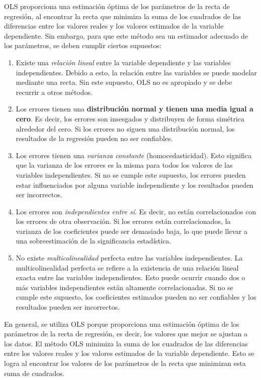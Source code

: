 \documentclass[
]{book}
\begin{document}
OLS proporciona una estimación óptima de los parámetros de la recta de
regresión, al encontrar la recta que minimiza la suma de los cuadrados
de las diferencias entre los valores reales y los valores estimados de
la variable dependiente. Sin embargo, para que este método sea un
estimador adecuado de los parámetros, se deben cumplir ciertos
supuestos:

\begin{enumerate}
\def\labelenumi{\arabic{enumi}.}
\item
  Existe una \emph{relación lineal} entre la variable dependiente y las
  variables independientes. Debido a esto, la relación entre las
  variables se puede modelar mediante una recta. Sin este supuesto,
  OLS no es apropiado y se debe recurrir a otros métodos.
\item
  Los errores tienen una \textbf{distribución normal y tienen una media
  igual a cero}. Es decir, los errores son insesgados y distribuyen
  de forma simétrica alrededor del cero. Si los errores no siguen una
  distribución normal, los resultados de la regresión pueden no ser
  confiables.
\item
  Los errores tienen una \emph{varianza constante} (homocedasticidad). Esto
  significa que la varianza de los errores es la misma para todos los
  valores de las variables independientes. Si no se cumple este
  supuesto, los errores pueden estar influenciados por alguna variable
  independiente y los resultados pueden ser incorrectos.
\item
  Los errores son \emph{independientes entre sí}. Es decir, no están
  correlacionados con los errores de otra observación. Si los errores
  están correlacionados, la varianza de los coeficientes puede ser
  demasiado baja, lo que puede llevar a una sobreestimación de la
  significancia estadística.
\item
  No existe \emph{multicolinealidad} perfecta entre las variables
  independientes. La multicolinealidad perfecta se refiere a la
  existencia de una relación lineal exacta entre las variables
  independientes. Esto puede ocurrir cuando dos o más variables
  independientes están altamente correlacionadas. Si no se cumple este
  supuesto, los coeficientes estimados pueden no ser confiables y los
  resultados pueden ser incorrectos.
\end{enumerate}

En general, se utiliza OLS porque proporciona una estimación óptima de
los parámetros de la recta de regresión, es decir, los valores que mejor
se ajustan a los datos. El método OLS minimiza la suma de los cuadrados
de las diferencias entre los valores reales y los valores estimados de
la variable dependiente. Esto se logra al encontrar los valores de los
parámetros de la recta que minimizan esta suma de cuadrados.
\end{document}
